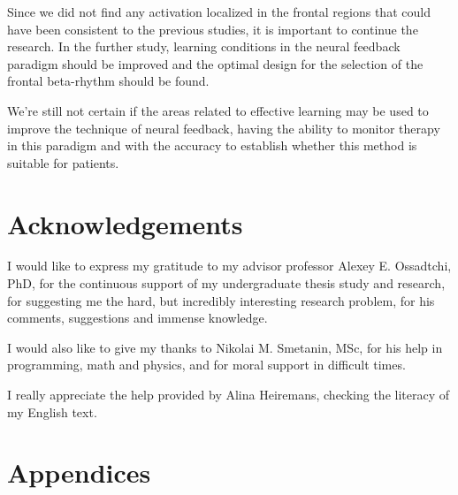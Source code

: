 \documentclass[14pt,a4paper]{scrartcl}
\begin{document}
Since we did not find any activation localized in the frontal regions that could have been consistent to the previous studies, it is important to continue the research. In the further study, learning conditions in the neural feedback paradigm should be improved and the optimal design for the selection of the frontal beta-rhythm should be found.

We’re still not certain if the areas related to effective learning may be used to improve the technique of neural feedback, having the ability to monitor therapy in this paradigm and with the accuracy to establish whether this method is suitable for patients.

\newpage
\section*{Acknowledgements}
\label{sec:Acknowledgements}

I would like to express my gratitude to my advisor professor Alexey E. Ossadtchi, PhD, for the continuous support of my undergraduate thesis study and research, for suggesting me the hard, but incredibly interesting research problem, for his comments, suggestions and immense knowledge.

I would also like to give my thanks to Nikolai M. Smetanin, MSc, for his help in programming, math and physics, and for moral support in difficult times. 

I really appreciate the help provided by Alina Heiremans, checking the literacy of my English text.

\newpage
\section*{Appendices}
\label{sec:Appendices}

\newpage


\end{document}
